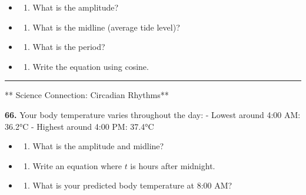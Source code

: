 \documentclass[
  11pt,
]{article}
\providecommand{\tightlist}{%
  \setlength{\itemsep}{0pt}\setlength{\parskip}{0pt}}
\begin{document}
\begin{itemize}
\item
  \begin{enumerate}
  \def\labelenumi{(\alph{enumi})}
  \tightlist
  \item
    What is the amplitude?
  \end{enumerate}
\item
  \begin{enumerate}
  \def\labelenumi{(\alph{enumi})}
  \setcounter{enumi}{1}
  \tightlist
  \item
    What is the midline (average tide level)?
  \end{enumerate}
\item
  \begin{enumerate}
  \def\labelenumi{(\alph{enumi})}
  \setcounter{enumi}{2}
  \tightlist
  \item
    What is the period?
  \end{enumerate}
\item
  \begin{enumerate}
  \def\labelenumi{(\alph{enumi})}
  \setcounter{enumi}{3}
  \tightlist
  \item
    Write the equation using cosine.
  \end{enumerate}
\end{itemize}

\begin{center}\rule{0.5\linewidth}{0.5pt}\end{center}

** Science Connection: Circadian Rhythms**

\textbf{66.} Your body temperature varies throughout the day: - Lowest
around 4:00 AM: 36.2°C - Highest around 4:00 PM: 37.4°C

\begin{itemize}
\item
  \begin{enumerate}
  \def\labelenumi{(\alph{enumi})}
  \tightlist
  \item
    What is the amplitude and midline?
  \end{enumerate}
\item
  \begin{enumerate}
  \def\labelenumi{(\alph{enumi})}
  \setcounter{enumi}{1}
  \tightlist
  \item
    Write an equation where \(t\) is hours after midnight.
  \end{enumerate}
\item
  \begin{enumerate}
  \def\labelenumi{(\alph{enumi})}
  \setcounter{enumi}{2}
  \tightlist
  \item
    What is your predicted body temperature at 8:00 AM?
  \end{enumerate}
\end{itemize}
\end{document}
